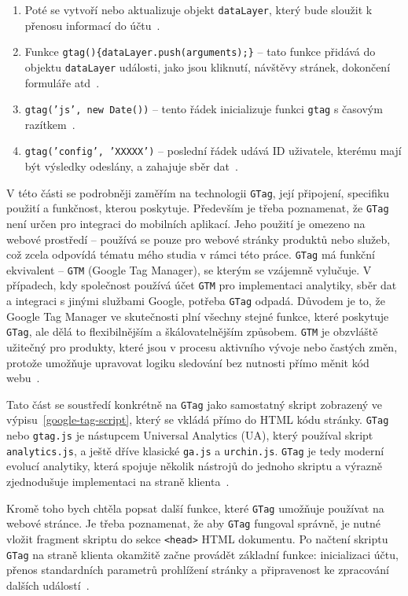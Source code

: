 \begin{enumerate}
  \item{Poté se vytvoří nebo aktualizuje objekt \texttt{dataLayer}, který bude sloužit k přenosu informací do účtu~\cite{dataLayer}.}
  \item{Funkce \texttt{gtag()\{dataLayer.push(arguments);\}} -- tato funkce přidává do objektu \texttt{dataLayer} události, jako jsou kliknutí, návštěvy stránek, dokončení formuláře atd~\cite{dataLayer}.}
  \item{\texttt{gtag('js', new Date())} -- tento řádek inicializuje funkci \texttt{gtag} s časovým razítkem~\cite{gtag}.}
  \item{\texttt{gtag('config', 'XXXXX')} -- poslední řádek udává ID uživatele, kterému mají být výsledky odeslány, a zahajuje sběr dat~\cite{idGoogle}.}
\end{enumerate}

V této části se podrobněji zaměřím na technologii \texttt{GTag}, její připojení, specifiku použití a funkčnost, kterou poskytuje. Především je třeba poznamenat, že \texttt{GTag} není určen pro integraci do mobilních aplikací. Jeho použití je omezeno na webové prostředí -- používá se pouze pro webové stránky produktů nebo služeb, což zcela odpovídá tématu mého studia v rámci této práce. \texttt{GTag} má funkční ekvivalent -- \texttt{GTM} (Google Tag Manager), se kterým se vzájemně vylučuje. V případech, kdy společnost používá účet \texttt{GTM} pro implementaci analytiky, sběr dat a integraci s jinými službami Google, potřeba \texttt{GTag} odpadá. Důvodem je to, že Google Tag Manager ve skutečnosti plní všechny stejné funkce, které poskytuje \texttt{GTag}, ale dělá to flexibilnějším a škálovatelnějším způsobem. \texttt{GTM} je obzvláště užitečný pro produkty, které jsou v procesu aktivního vývoje nebo častých změn, protože umožňuje upravovat logiku sledování bez nutnosti přímo měnit kód webu~\cite{gtag}.

Tato část se soustředí konkrétně na \texttt{GTag} jako samostatný skript zobrazený ve výpisu~\ref{google-tag-script}, který se vkládá přímo do HTML kódu stránky. \texttt{GTag} nebo \texttt{gtag.js} je nástupcem Universal Analytics (UA), který používal skript \texttt{analytics.js}, a ještě dříve klasické \texttt{ga.js} a \texttt{urchin.js}. \texttt{GTag} je tedy moderní evolucí analytiky, která spojuje několik nástrojů do jednoho skriptu a výrazně zjednodušuje implementaci na straně klienta~\cite{gtag}.

Kromě toho bych chtěla popsat další funkce, které \texttt{GTag} umožňuje používat na webové stránce. Je třeba poznamenat, že aby \texttt{GTag} fungoval správně, je nutné vložit fragment skriptu do sekce \texttt{<head>} HTML dokumentu. Po načtení skriptu \texttt{GTag} na straně klienta okamžitě začne provádět základní funkce: inicializaci účtu, přenos standardních parametrů prohlížení stránky a připravenost ke zpracování dalších událostí~\cite{idGoogle}.

